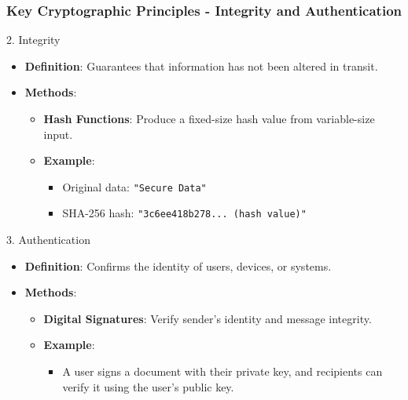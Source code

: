 \documentclass{beamer}
\begin{document}
\begin{frame}[fragile]
    \frametitle{Key Cryptographic Principles - Integrity and Authentication}
    \begin{block}{2. Integrity}
        \begin{itemize}
            \item \textbf{Definition}: Guarantees that information has not been altered in transit.
            \item \textbf{Methods}:
                \begin{itemize}
                    \item \textbf{Hash Functions}: Produce a fixed-size hash value from variable-size input.
                    \item \textbf{Example}:
                      \begin{itemize}
                          \item Original data: \texttt{"Secure Data"}
                          \item SHA-256 hash: \texttt{"3c6ee418b278... (hash value)"}
                      \end{itemize}
                \end{itemize}
        \end{itemize}
    \end{block}

    \begin{block}{3. Authentication}
        \begin{itemize}
            \item \textbf{Definition}: Confirms the identity of users, devices, or systems.
            \item \textbf{Methods}:
                \begin{itemize}
                    \item \textbf{Digital Signatures}: Verify sender's identity and message integrity.
                    \item \textbf{Example}:
                      \begin{itemize}
                          \item A user signs a document with their private key, and recipients can verify it using the user’s public key.
                      \end{itemize}
                \end{itemize}
        \end{itemize}
    \end{block}
\end{frame}
\end{document}
